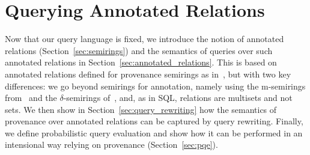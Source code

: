 \section{Querying Annotated Relations}
\label{sec:annotated}

Now that our query language is fixed, we introduce the notion of annotated
relations (Section~\ref{sec:semirings}) and the semantics of queries over
such annotated relations in Section~\ref{sec:annotated_relations}.
This is based on annotated relations defined for provenance semirings as
in~\cite{green2007provenance}, but with two key differences: we go beyond
semirings for annotation, namely using the m-semirings
from~\cite{dblp:journals/japll/geertsp10} and the $\delta$-semirings
of~\cite{amsterdamer2011provenance}, and, as in SQL, relations are multisets and not
sets. We
then show in Section~\ref{sec:query_rewriting} how the semantics of provenance
over annotated relations can be captured by query rewriting. Finally, we
define probabilistic query evaluation and show how it can
be performed in an intensional way relying on provenance
(Section~\ref{sec:pqe}).





